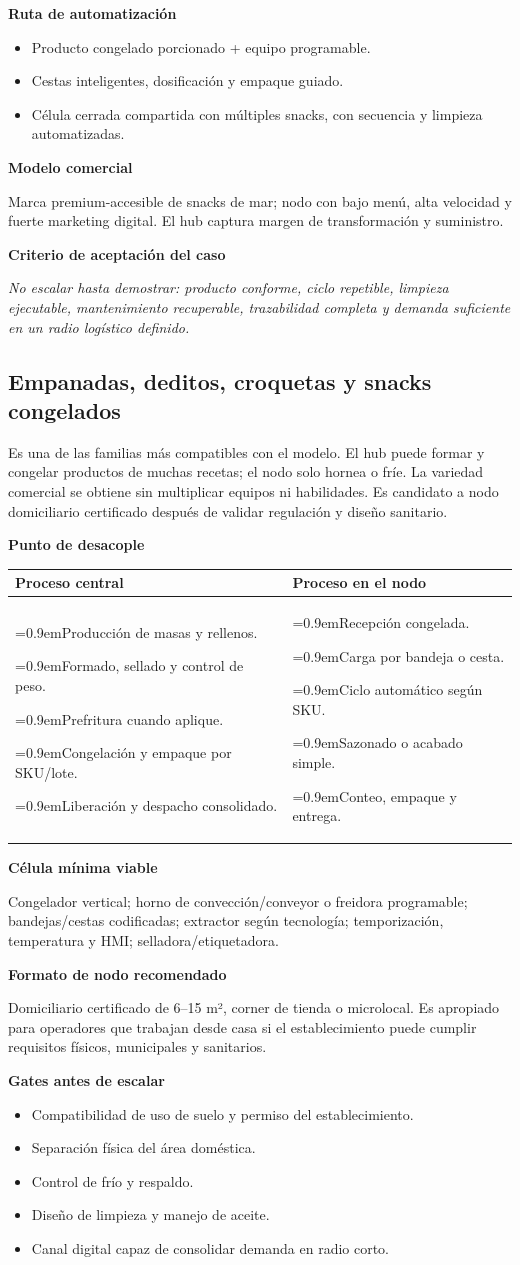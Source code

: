 \documentclass[11pt,a4paper]{article}
\makeatletter
\newcommand{\etiqueta}[1]{\par\medskip\noindent\textbf{#1}\par\nopagebreak\smallskip}
\newcommand{\ti}{\par\hangindent=0.9em\hangafter=1\noindent\makebox[0.9em][l]{\textbullet}}
\newcommand{\desacople}[2]{\etiqueta{Punto de desacople}
  {\small\noindent\begin{tabularx}{\textwidth}{@{}>{\raggedright\arraybackslash}X>{\raggedright\arraybackslash}X@{}}
  \toprule \textbf{Proceso central} & \textbf{Proceso en el nodo}\\ \midrule
  #1 & #2\\ \bottomrule\end{tabularx}}\par}
\newcommand{\rutas}[3]{\etiqueta{Ruta de automatización}
  \begin{itemize}[leftmargin=2.6em,labelwidth=2em]
  \item[\textbf{1.0}] #1
  \item[\textbf{2.0}] #2
  \item[\textbf{3.0}] #3
  \end{itemize}}
\newcommand{\criterio}{\etiqueta{Criterio de aceptación del caso}
  \noindent\textit{No escalar hasta demostrar: producto conforme, ciclo repetible, limpieza ejecutable,
  mantenimiento recuperable, trazabilidad completa y demanda suficiente en un radio logístico definido.}\par}
\makeatother
\begin{document}
\rutas{Producto congelado porcionado + equipo programable.}
{Cestas inteligentes, dosificación y empaque guiado.}
{Célula cerrada compartida con múltiples snacks, con secuencia y limpieza automatizadas.}

\etiqueta{Modelo comercial}
Marca premium-accesible de snacks de mar; nodo con bajo menú, alta velocidad y fuerte marketing digital.
El hub captura margen de transformación y suministro.

\criterio

\subsection{Empanadas, deditos, croquetas y snacks congelados}
Es una de las familias más compatibles con el modelo. El hub puede formar y congelar productos de muchas
recetas; el nodo solo hornea o fríe. La variedad comercial se obtiene sin multiplicar equipos ni
habilidades. Es candidato a nodo domiciliario certificado después de validar regulación y diseño
sanitario.

\desacople{%
\ti Producción de masas y rellenos.
\ti Formado, sellado y control de peso.
\ti Prefritura cuando aplique.
\ti Congelación y empaque por SKU/lote.
\ti Liberación y despacho consolidado.}{%
\ti Recepción congelada.
\ti Carga por bandeja o cesta.
\ti Ciclo automático según SKU.
\ti Sazonado o acabado simple.
\ti Conteo, empaque y entrega.}

\etiqueta{Célula mínima viable}
Congelador vertical; horno de convección/conveyor o freidora programable; bandejas/cestas codificadas;
extractor según tecnología; temporización, temperatura y HMI; selladora/etiquetadora.

\etiqueta{Formato de nodo recomendado}
Domiciliario certificado de 6--15 m², corner de tienda o microlocal. Es apropiado para operadores que
trabajan desde casa si el establecimiento puede cumplir requisitos físicos, municipales y sanitarios.

\etiqueta{Gates antes de escalar}
\begin{itemize}
\item Compatibilidad de uso de suelo y permiso del establecimiento.
\item Separación física del área doméstica.
\item Control de frío y respaldo.
\item Diseño de limpieza y manejo de aceite.
\item Canal digital capaz de consolidar demanda en radio corto.
\end{itemize}
\end{document}
